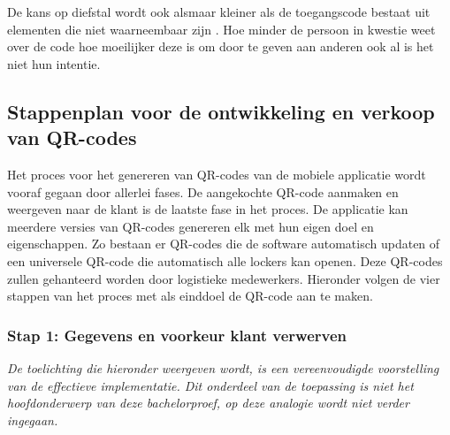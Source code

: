 De kans op diefstal wordt ook alsmaar kleiner als de toegangscode bestaat uit elementen die niet waarneembaar zijn \autocite{Baharav2013}. Hoe minder de persoon in kwestie weet over de code hoe moeilijker deze is om door te geven aan anderen ook al is het niet hun intentie.

\newpage
\subsection{Stappenplan voor de ontwikkeling en verkoop van QR-codes}%
\label{sec:opbouwQR-codeVerkoop}

Het proces voor het genereren van QR-codes van de mobiele applicatie wordt vooraf gegaan door allerlei fases. De aangekochte QR-code aanmaken en weergeven naar de klant is de laatste fase in het proces. De applicatie kan meerdere versies van QR-codes genereren elk met hun eigen doel en eigenschappen. Zo bestaan er QR-codes die de software automatisch updaten of een universele QR-code die automatisch alle lockers kan openen. Deze QR-codes zullen gehanteerd worden door logistieke medewerkers. Hieronder volgen de vier stappen van het proces met als einddoel de QR-code aan te maken.

\begin{comment}
    Hoewel een QR-code een standaard grafische voorstelling is, kan de grootte van een code verschillen. Wanneer een code groter is, ontstaat er meer witruimte tussen de pixels \autocite{Li2018}. Hierdoor kan de camera de code makkelijker en sneller scannen \autocite{Karrach2020}. Ook de foutcorrectie zorgt ervoor dat de resolutie vergroot zal worden. Hoe groter de resolutie van de QR-code hoe meer data gestockeerd kan worden \autocite{Chow2016}. 
\end{comment}


\subsubsection{Stap 1: Gegevens en voorkeur klant verwerven}%
\label{sec:opbouwQR-codeVerkoop1}

\textit {De toelichting die hieronder weergeven wordt, is een vereenvoudigde voorstelling van de effectieve implementatie. Dit onderdeel van de toepassing is niet het hoofdonderwerp van deze bachelorproef, op deze analogie wordt niet verder ingegaan.}

